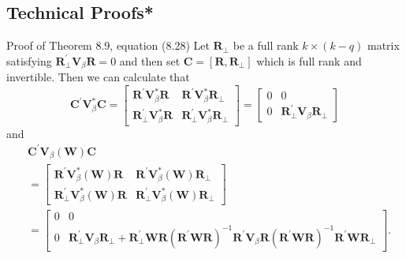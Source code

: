 \documentclass[10pt]{article}
\begin{document}
\subsection{Technical Proofs*}
Proof of Theorem 8.9, equation (8.28) Let $\boldsymbol{R}_{\perp}$ be a full rank $k \times(k-q)$ matrix satisfying $\boldsymbol{R}_{\perp}^{\prime} \boldsymbol{V}_{\beta} \boldsymbol{R}=0$ and then set $\boldsymbol{C}=\left[\boldsymbol{R}, \boldsymbol{R}_{\perp}\right]$ which is full rank and invertible. Then we can calculate that
$$
\boldsymbol{C}^{\prime} \boldsymbol{V}_{\beta}^{*} \boldsymbol{C}=\left[\begin{array}{cc}
\boldsymbol{R}^{\prime} \boldsymbol{V}_{\beta}^{*} \boldsymbol{R} & \boldsymbol{R}^{\prime} \boldsymbol{V}_{\beta}^{*} \boldsymbol{R}_{\perp} \\
\boldsymbol{R}_{\perp}^{\prime} \boldsymbol{V}_{\beta}^{*} \boldsymbol{R} & \boldsymbol{R}_{\perp}^{\prime} \boldsymbol{V}_{\beta}^{*} \boldsymbol{R}_{\perp}
\end{array}\right]=\left[\begin{array}{cc}
0 & 0 \\
0 & \boldsymbol{R}_{\perp}^{\prime} \boldsymbol{V}_{\beta} \boldsymbol{R}_{\perp}
\end{array}\right]
$$
and
$$
\begin{aligned}
&\boldsymbol{C}^{\prime} \boldsymbol{V}_{\beta}(\boldsymbol{W}) \boldsymbol{C} \\
&=\left[\begin{array}{cc}
\boldsymbol{R}^{\prime} \boldsymbol{V}_{\beta}^{*}(\boldsymbol{W}) \boldsymbol{R} & \boldsymbol{R}^{\prime} \boldsymbol{V}_{\beta}^{*}(\boldsymbol{W}) \boldsymbol{R}_{\perp} \\
\boldsymbol{R}_{\perp}^{\prime} \boldsymbol{V}_{\beta}^{*}(\boldsymbol{W}) \boldsymbol{R} & \boldsymbol{R}_{\perp}^{\prime} \boldsymbol{V}_{\beta}^{*}(\boldsymbol{W}) \boldsymbol{R}_{\perp}
\end{array}\right] \\
&=\left[\begin{array}{cc}
0 & 0 \\
0 & \boldsymbol{R}_{\perp}^{\prime} \boldsymbol{V}_{\beta} \boldsymbol{R}_{\perp}+\boldsymbol{R}_{\perp}^{\prime} \boldsymbol{W} \boldsymbol{R}\left(\boldsymbol{R}^{\prime} \boldsymbol{W} \boldsymbol{R}\right)^{-1} \boldsymbol{R}^{\prime} \boldsymbol{V}_{\beta} \boldsymbol{R}\left(\boldsymbol{R}^{\prime} \boldsymbol{W} \boldsymbol{R}\right)^{-1} \boldsymbol{R}^{\prime} \boldsymbol{W} \boldsymbol{R}_{\perp}
\end{array}\right] .
\end{aligned}
$$
\end{document}
